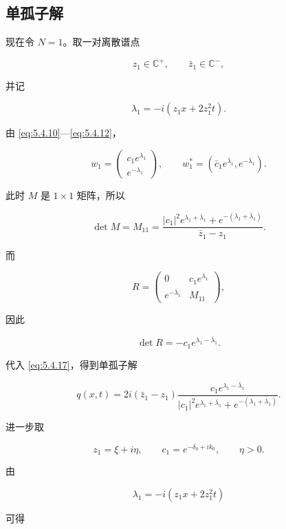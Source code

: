 \documentclass[
    lang=cn,
    scheme=chinese,
    mode=simple,
    device=normal,
    color=blue,
    math=cm,
    thmcnt=section,
    12pt,
    nowatermark
]{elegantbook}
\begin{document}
\subsection{单孤子解}

现在令 $N=1$。取一对离散谱点

\[
    z_1\in\mathbb{C}^+,
    \qquad
    \bar z_1\in\mathbb{C}^-,
\]

并记

\[
    \lambda_1
    =
    -i(z_1x+2z_1^2t).
\]

由 \eqref{eq:5.4.10}---\eqref{eq:5.4.12}，

\[
    w_1
    =
    \begin{pmatrix}
        c_1e^{\lambda_1} \\
        e^{-\lambda_1}
    \end{pmatrix},
    \qquad
    w_1^*
    =
    \left(
    \bar c_1e^{\bar\lambda_1},
    e^{-\bar\lambda_1}
    \right).
\]

此时 $M$ 是 $1\times1$ 矩阵，所以

\[
    \det M
    =
    M_{11}
    =
    \dfrac{
        \lvert c_1\rvert^2e^{\lambda_1+\bar\lambda_1}
        +
        e^{-(\lambda_1+\bar\lambda_1)}
    }{
        \bar z_1-z_1
    }.
\]

而

\[
    R=
    \begin{pmatrix}
        0                  & c_1e^{\lambda_1} \\
        e^{-\bar\lambda_1} & M_{11}
    \end{pmatrix},
\]

因此

\[
    \det R
    =
    -c_1e^{\lambda_1-\bar\lambda_1}.
\]

代入 \eqref{eq:5.4.17}，得到单孤子解

\begin{equation}
    q(x,t)
    =
    2i(\bar z_1-z_1)
    \dfrac{
        c_1e^{\lambda_1-\bar\lambda_1}
    }{
        \lvert c_1\rvert^2e^{\lambda_1+\bar\lambda_1}
        +
        e^{-(\lambda_1+\bar\lambda_1)}
    }.
    \tag{5.4.18}
    \label{eq:5.4.18}
\end{equation}

进一步取

\[
    z_1=\xi+i\eta,
    \qquad
    c_1=e^{-\delta_0+ik_0},
    \qquad
    \eta>0.
\]

由

\[
    \lambda_1=-i(z_1x+2z_1^2t)
\]

可得
\end{document}
